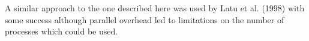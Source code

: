 
A similar approach to the one described here was used by Latu et al. (1998) \cite{ParallelisationSemi-LagrangianVlasovCodes} with some success although parallel overhead led to limitations on the number of processes which could be used.


% 
